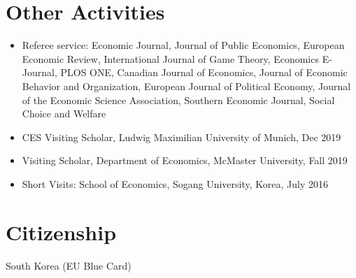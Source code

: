 \documentclass[margin, letterpaper]{res}
\begin{document}
\begin{resume}

\section{Other Activities}
\begin{itemize}
\item Referee service: Economic Journal, Journal of Public Economics, European Economic Review, International Journal of Game Theory, Economics E-Journal, PLOS ONE, Canadian Journal of Economics, Journal of Economic Behavior and Organization, European Journal of Political Economy, Journal of the Economic Science Association, Southern Economic Journal, Social Choice and Welfare
\item CES Visiting Scholar, Ludwig Maximilian University of Munich, Dec 2019
\item Visiting Scholar, Department of Economics, McMaster University, Fall 2019
\item Short Visits: School of Economics, Sogang University, Korea, July 2016
\end{itemize}

\section{Citizenship} South Korea (EU Blue Card)%


\end{resume}
\end{document}
